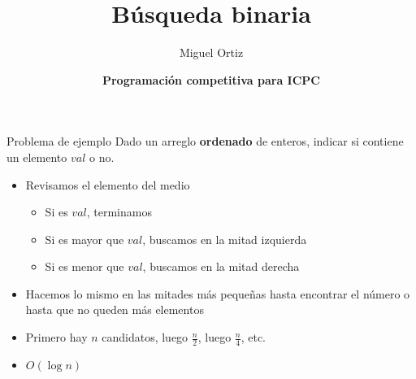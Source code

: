 \documentclass[10pt]{beamer}
\title{Búsqueda binaria}
\author{Miguel Ortiz}
\institute{Octubre 2023}
\date{\textbf{Programación competitiva para ICPC}}
\newcommand{\bi}{\begin{itemize}}
\newcommand{\ei}{\end{itemize}}
\begin{document}
\maketitle

\begin{frame}{Problema de ejemplo}
  Dado un arreglo \textbf{ordenado} de enteros, indicar si contiene un elemento \textbf{$val$} o no.
  \vspace{20pt}

  \bi
    \item<2-> Revisamos el elemento del medio
    \bi
      \item<2-> Si es $val$, terminamos
      \item<2-> Si es mayor que $val$, buscamos en la mitad izquierda
      \item<2-> Si es menor que $val$, buscamos en la mitad derecha
    \ei
    \item<3-> Hacemos lo mismo en las mitades más pequeñas hasta encontrar el número o hasta que no queden más elementos
    \item<4-> Primero hay $n$ candidatos, luego $\frac{n}{2}$, luego $\frac{n}{4}$, etc.
    \item<4-> $O(\log n)$
  \ei
\end{frame}
\end{document}

